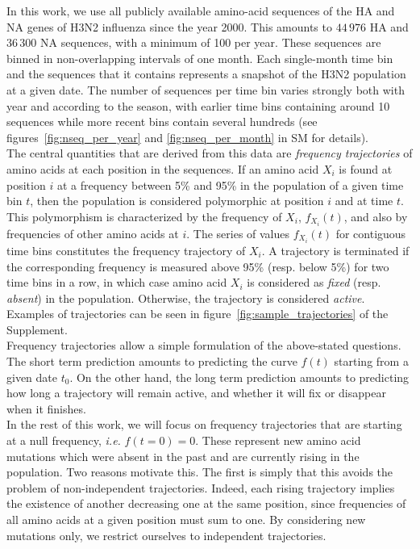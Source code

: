 \documentclass{article}
\begin{document}

	In this work, we use all publicly available amino-acid sequences of the HA and NA genes of H3N2 influenza since the year 2000. This amounts to $44\,976$ HA and $36\,300$ NA sequences, with a minimum of 100 per year. These sequences are binned in non-overlapping intervals of one month. Each single-month time bin and the sequences that it contains represents a snapshot of the H3N2 population at a given date. The number of sequences per time bin varies strongly both with year and according to the season, with earlier time bins containing around 10 sequences while more recent bins contain several hundreds (see figures~\ref{fig:nseq_per_year} and \ref{fig:nseq_per_month} in SM for details).\\
	The central quantities that are derived from this data are \emph{frequency trajectories} of amino acids at each position in the sequences. If an amino acid $X_i$ is found at position $i$ at a frequency between 5\% and 95\% in the population of a given time bin $t$, then the population is considered polymorphic at position $i$ and at time $t$. This polymorphism is characterized by the frequency of $X_i$, $f_{X_i}(t)$, and also by frequencies of other amino acids at $i$. The series of values $f_{X_i}(t)$ for contiguous time bins constitutes the frequency trajectory of $X_i$. A trajectory is terminated if the corresponding frequency is measured above 95\% (resp. below 5\%) for two time bins in a row, in which case amino acid $X_i$ is considered as \emph{fixed} (resp. \emph{absent}) in the population. Otherwise, the trajectory is considered \emph{active}. Examples of trajectories can be seen in figure~\ref{fig:sample_trajectories} of the Supplement.\\%
	Frequency trajectories allow a simple formulation of the above-stated questions. The short term prediction amounts to predicting the curve $f(t)$ starting from a given date $t_0$. On the other hand, the long term prediction amounts to predicting how long a trajectory will remain active, and whether it will fix or disappear when it finishes. \\
	In the rest of this work, we will focus on frequency trajectories that are starting at a null frequency, \emph{i.e.} $f(t=0)=0$. These represent new amino acid mutations which were absent in the past and are currently rising in the population. Two reasons motivate this. The first is simply that this avoids the problem of non-independent trajectories. Indeed, each rising trajectory implies the existence of another decreasing one at the same position, since frequencies of all amino acids at a given position must sum to one. By considering new mutations only, we restrict ourselves to independent trajectories. \\
\end{document}
